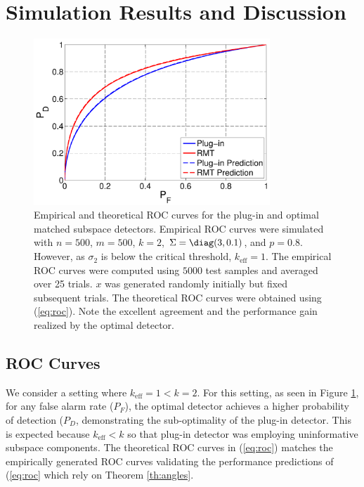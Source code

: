 \section{Simulation Results and Discussion}\label{sec:results}

\begin{figure}[t]
\centering
\includegraphics[width=3.5in]{figures/basic_roc.pdf}
\caption{Empirical and theoretical ROC curves for the plug-in and optimal matched subspace detectors. Empirical ROC curves were simulated with $n=500$, $m=500$, $k=2$, $\Sigma=\diag(3,0.1)$, and $p=0.8$. However, as $\sigma_2$ is below the critical threshold, $k_{\text{eff}} = 1$. The empirical ROC curves were computed using $5000$ test samples and averaged over 25 trials. $x$ was generated randomly initially but fixed subsequent trials. The theoretical ROC curves were obtained using (\ref{eq:roc}). Note the excellent agreement and the performance gain realized by the optimal detector.}\vskip-0.15cm
\label{fig:roc1}
\end{figure}


\subsection{ROC Curves}

We consider a setting where $k_{\text{eff}} = 1 < k = 2$. For this setting, as seen in Figure \ref{fig:roc1}, for any false alarm rate ($P_F$), the optimal detector achieves a higher probability of detection ($P_D$, demonstrating the sub-optimality of the plug-in detector. This is expected because $k_\text{eff}<k$ so that plug-in detector was employing uninformative subspace components. The theoretical ROC curves in (\ref{eq:roc}) matches the empirically generated ROC curves validating the performance predictions of (\ref{eq:roc} which rely on Theorem \ref{th:angles}.

